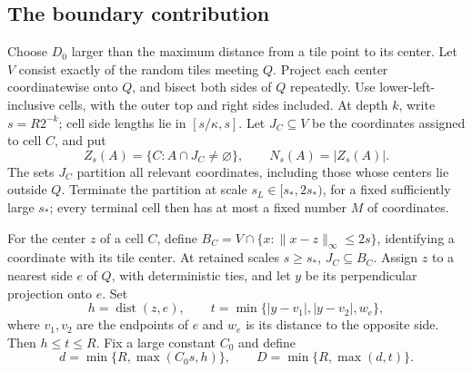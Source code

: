 \documentclass[11pt]{amsart}
\theoremstyle{remark}
\begin{document}
\subsection{The boundary contribution}

Choose $D_0$ larger than the maximum distance from a tile point to its center. Let $V$ consist exactly of the random tiles meeting $Q$. Project each center coordinatewise onto $Q$, and bisect both sides of $Q$ repeatedly. Use lower-left-inclusive cells, with the outer top and right sides included. At depth $k$, write $s=R2^{-k}$; cell side lengths lie in $[s/\kappa,s]$. Let $J_C\subseteq V$ be the coordinates assigned to cell $C$, and put
\[
 Z_s(A)=\{C:A\cap J_C\ne\varnothing\},\qquad N_s(A)=|Z_s(A)|.
\]
The sets $J_C$ partition all relevant coordinates, including those whose centers lie outside $Q$. Terminate the partition at scale $s_L\in[s_*,2s_*)$, for a fixed sufficiently large $s_*$; every terminal cell then has at most a fixed number $M$ of coordinates.

For the center $z$ of a cell $C$, define $B_C=V\cap\{x:\|x-z\|_\infty\le2s\}$, identifying a coordinate with its tile center. At retained scales $s\ge s_*$, $J_C\subseteq B_C$. Assign $z$ to a nearest side $e$ of $Q$, with deterministic ties, and let $y$ be its perpendicular projection onto $e$. Set
\[
 h=\operatorname{dist}(z,e),\qquad
 t=\min\{|y-v_1|,|y-v_2|,w_e\},
\]
where $v_1,v_2$ are the endpoints of $e$ and $w_e$ is its distance to the opposite side.
Then $h\le t\le R$. Fix a large constant $C_0$ and define
\[
 d=\min\{R,\max(C_0s,h)\},\qquad
 D=\min\{R,\max(d,t)\}.
\]
\end{document}
